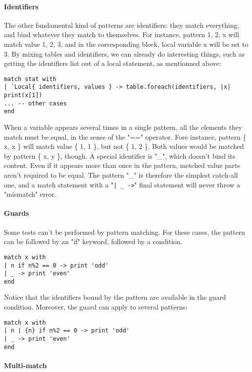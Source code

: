\paragraph{Identifiers}
The other fundamental kind of patterns are identifiers: they match everything,
and bind whatever they match to themselves. For instance, pattern {1, 2, x} will
match value {1, 2, 3}, and in the corresponding block, local variable x will be
set to 3. By mixing tables and identifiers, we can already do interesting
things, such as getting the identifiers list out of a local statement, as
mentionned above:

\begin{verbatim}
match stat with
| `Local{ identifiers, values } -> table.foreach(identifiers, |x| print(x[1])
... -- other cases
end
\end{verbatim}

When a variable appears several times in a single pattern, all the elements they
match must be equal, in the sense of the "==" operator. Fore instance, pattern \{
  x, x \} will match value \{ 1, 1 \}, but not \{ 1, 2 \}. Both values would be
matched by pattern \{ x, y \}, though. A special identifier is "\_", which doesn't
bind its content. Even if it appears more than once in the pattern, metched
value parts aren't required to be equal. The pattern "\_" is therefore the
simplest catch-all one, and a match statement with a "{\tt| \_ ->}" final
statement will never throw a "mismatch" error.

\paragraph{Guards}

Some tests can't be performed by pattern matching. For these cases, the pattern
can be followed by an "if" keyword, followed by a condition.

\begin{verbatim}
match x with
| n if n%2 == 0 -> print 'odd'
| _ -> print 'even'
end
\end{verbatim}

Notice that the identifiers bound by the pattern are available in the guard
condition. Moreover, the guard can apply to several patterns:

\begin{verbatim}
match x with
| n | {n} if n%2 == 0 -> print 'odd'
| _ -> print 'even'
end
\end{verbatim}

\paragraph{Multi-match}

